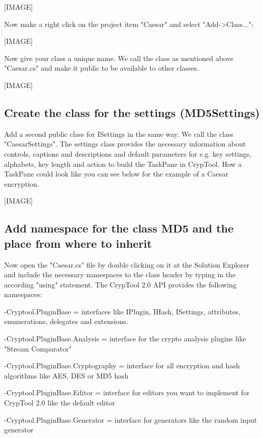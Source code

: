 [IMAGE]

Now make a right click on the project item "Caesar" and select "Add->Class...":

[IMAGE]

Now give your class a unique name. We call the class as mentioned above "Caesar.cs" and make it public to be available to other classes.

[IMAGE]

\subsection{Create the class for the settings (MD5Settings)}\label{sec:CreateTheClassForTheSettingsCaesarSettings}
Add a second public class for ISettings in the same way. We call the class "CaesarSettings". The settings class provides the necessary information about controls, captions and descriptions and default parameters for e.g. key settings, alphabets, key length and action to build the TaskPane in CrypTool. How a TaskPane could look like you can see below for the example of a Caesar encryption.

[IMAGE]
\subsection{Add namespace for the class MD5 and the place from where to inherit}
\label{sec:AddNamespaceForTheClassMD5AndThePlaceFromWhereToInherit}
Now open the "Caesar.cs" file by double clicking on it at the Solution Explorer and include the necessary namespaces to the class header by typing in the according "using" statement. The CrypTool 2.0 API provides the following namespaces:

\hspace{20pt}-Cryptool.PluginBase = interfaces like IPlugin, IHash, ISettings, attributes, enumerations, delegates and extensions.

\hspace{20pt}-Cryptool.PluginBase.Analysis = interface for the crypto analysis plugins like "Stream Comparator"

\hspace{20pt}-Cryptool.PluginBase.Cryptography = interface for all encryption and hash algorithms like AES, DES or MD5 hash

\hspace{20pt}-Cryptool.PluginBase.Editor = interface for editors you want to implement for CrypTool 2.0 like the default editor

\hspace{20pt}-Cryptool.PluginBase.Generator = interface for generators like the random input generator

